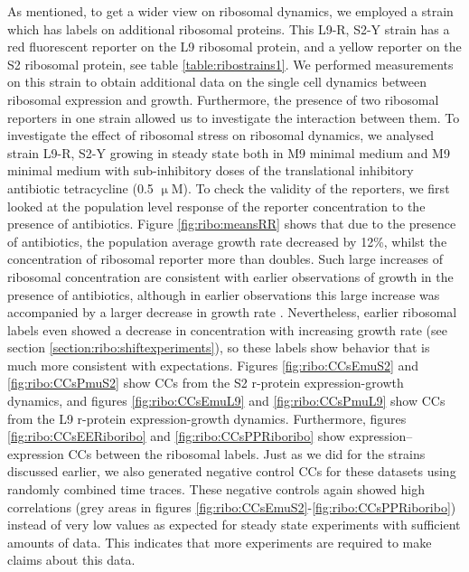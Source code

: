 As mentioned, to get a wider view on ribosomal dynamics, we employed a strain which has labels on additional ribosomal proteins. 
%
This L9-R, S2-Y strain has a red fluorescent reporter on the L9 ribosomal protein, and a yellow reporter on the S2 ribosomal protein, see table \ref{table:ribostrains1}.
%
We performed measurements on this strain 
to obtain additional data 
on the single cell dynamics between ribosomal expression and growth.
%
Furthermore, the presence of two ribosomal reporters in one strain allowed us to investigate the interaction between them.
%
To investigate the effect of ribosomal stress on ribosomal dynamics, 
we analysed strain L9-R, S2-Y 
growing in steady state both in M9 minimal medium and M9 minimal medium with sub-inhibitory doses of the translational inhibitory antibiotic tetracycline (0.5 $\upmu$M).
%
To check the validity of the reporters, 
we first looked at the population level response of the reporter concentration to the presence of antibiotics.
Figure \ref{fig:ribo:meansRR} shows that due to the presence of antibiotics, the population average growth rate decreased by 12\%, whilst the concentration of ribosomal reporter more than doubles.
%
Such large increases of ribosomal concentration are consistent with earlier observations of growth in the presence of antibiotics, although in earlier observations this large increase was accompanied by a larger decrease in growth rate \cite{Hui2015}.
%
Nevertheless, earlier ribosomal labels even showed a decrease in concentration with increasing growth rate (see section \ref{section:ribo:shiftexperiments}), 
so these labels show behavior that is much more consistent with expectations.
%
Figures \ref{fig:ribo:CCsEmuS2} and \ref{fig:ribo:CCsPmuS2} show CCs from the S2 r-protein expression-growth dynamics, and 
figures \ref{fig:ribo:CCsEmuL9} and \ref{fig:ribo:CCsPmuL9} show CCs from the L9 r-protein expression-growth dynamics.
Furthermore, figures \ref{fig:ribo:CCsEERiboribo} and \ref{fig:ribo:CCsPPRiboribo} show expression--expression CCs between the ribosomal labels.
%
Just as we did for the strains discussed earlier, 
we also generated negative control CCs for these datasets
using randomly combined time traces. 
These negative controls again
showed high correlations (grey areas in figures \ref{fig:ribo:CCsEmuS2}-\ref{fig:ribo:CCsPPRiboribo}) instead of very low values as expected for steady state experiments with sufficient amounts of data.
This indicates that more experiments are required to make claims about this data.





